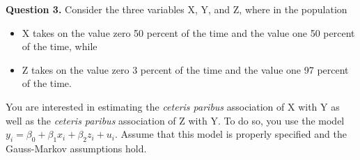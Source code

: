 \documentclass[12pt]{article}
\begin{document}
\clearpage
\textbf{Question 3.} \hspace{3mm} Consider the three variables X, Y, and Z, where in the population
\begin{itemize}
\item X takes on the value zero 50 percent of the time and the value one 50 percent of the
time, while
\item Z takes on the value zero 3 percent of the time and the value one 97 percent of the time.
\end{itemize}
You are interested in estimating the \emph{ceteris paribus} association of X with Y as well as the \emph{ceteris paribus} association of Z with Y. To do so, you use the model $y_i = \beta_0 + \beta_1 x_i + \beta_2 z_i + u_i$.  Assume that this model is properly specified and the Gauss-Markov assumptions hold.
\end{document}
